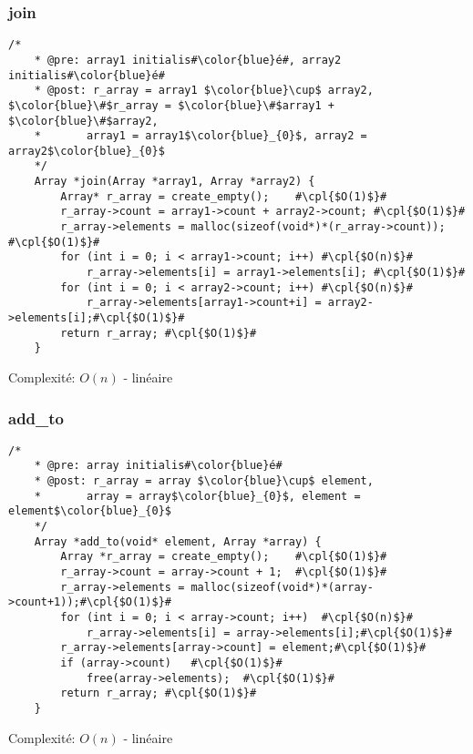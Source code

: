 \documentclass[a4paper, 11pt, oneside]{article}
\begin{document}
	\subsubsection{join}
	\begin{lstlisting}[mathescape]
	/*
	* @pre: array1 initialis#\color{blue}é#, array2 initialis#\color{blue}é#
	* @post: r_array = array1 $\color{blue}\cup$ array2, $\color{blue}\#$r_array = $\color{blue}\#$array1 + $\color{blue}\#$array2,
	*		array1 = array1$\color{blue}_{0}$, array2 = array2$\color{blue}_{0}$
	*/
	Array *join(Array *array1, Array *array2) {
		Array* r_array = create_empty();	#\cpl{$O(1)$}#
		r_array->count = array1->count + array2->count;	#\cpl{$O(1)$}#
		r_array->elements = malloc(sizeof(void*)*(r_array->count));	#\cpl{$O(1)$}#
		for (int i = 0; i < array1->count; i++)	#\cpl{$O(n)$}#
			r_array->elements[i] = array1->elements[i];	#\cpl{$O(1)$}#
		for (int i = 0; i < array2->count; i++)	#\cpl{$O(n)$}#
			r_array->elements[array1->count+i] = array2->elements[i];#\cpl{$O(1)$}#
		return r_array;	#\cpl{$O(1)$}#
	}
	\end{lstlisting}
	Complexité: $O(n)$ - linéaire
	
	\clearpage
	\subsubsection{add\_to}
	\begin{lstlisting}[mathescape]
	/*
	* @pre: array initialis#\color{blue}é#
	* @post: r_array = array $\color{blue}\cup$ element,
	*		array = array$\color{blue}_{0}$, element = element$\color{blue}_{0}$
	*/
	Array *add_to(void* element, Array *array) {
		Array *r_array = create_empty();	#\cpl{$O(1)$}#
		r_array->count = array->count + 1;	#\cpl{$O(1)$}#
		r_array->elements = malloc(sizeof(void*)*(array->count+1));#\cpl{$O(1)$}#
		for (int i = 0; i < array->count; i++)	#\cpl{$O(n)$}#
			r_array->elements[i] = array->elements[i];#\cpl{$O(1)$}#
		r_array->elements[array->count] = element;#\cpl{$O(1)$}#
		if (array->count)	#\cpl{$O(1)$}#
			free(array->elements);	#\cpl{$O(1)$}#
		return r_array;	#\cpl{$O(1)$}#
	}
	\end{lstlisting}
	Complexité: $O(n)$ - linéaire
\end{document}
